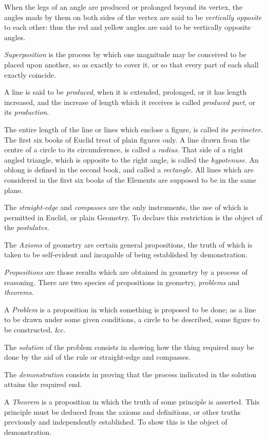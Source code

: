 When the legs of an angle are produced or prolonged beyond its vertex, the angles made by them on both sides of the vertex are said to be \emph{vertically opposite} to each other: thus the red and yellow angles are said to be vertically opposite angles.

\emph{Superposition} is the process by which one magnitude may be conceived to be placed upon another, so as exactly to cover it, or so that every part of each shall exactly coincide.

A line is said to be \emph{produced}, when it is extended, prolonged, or it has length increased, and the increase of length which it receives is called \emph{produced part}, or its \emph{production}.

The entire length of the line or lines which enclose a figure, is called its \emph{perimeter}. The first six books of Euclid treat of plain figures only. A line drawn from the centre of a circle to its circumference, is called a \emph{radius}. That side of a right angled triangle, which is opposite to the right angle, is called the \emph{hypotenuse}. An oblong is defined in the second book, and called a \emph{rectangle}. All lines which are considered in the first six books of the Elements are supposed to be in the same plane.

The \emph{straight-edge} and \emph{compasses} are the only instruments, the use of which is permitted in Euclid, or plain Geometry. To declare this restriction is the object of the \emph{postulates.}

The \emph{Axioms} of geometry are certain general propositions, the truth of which is taken to be self-evident and incapable of being established by demonstration.

\emph{Propositions} are those results which are obtained in geometry by a process of reasoning. There are two species of propositions in geometry, \emph{problems} and \emph{theorems}.

A \emph{Problem} is a proposition in which something is proposed to be done; as a line to be drawn under some given conditions, a circle to be described, some figure to be constructed, \&c.

The \emph{solution} of the problem consists in showing how the thing required may be done by the aid of the rule or straight-edge and compasses.

The \emph{demonstration} consists in proving that the process indicated in the solution attains the required end.

A \emph{Theorem} is a proposition in which the truth of some principle is asserted. This principle must be deduced from the axioms and definitions, or other truths previously and independently established. To show this is the object of demonstration.

